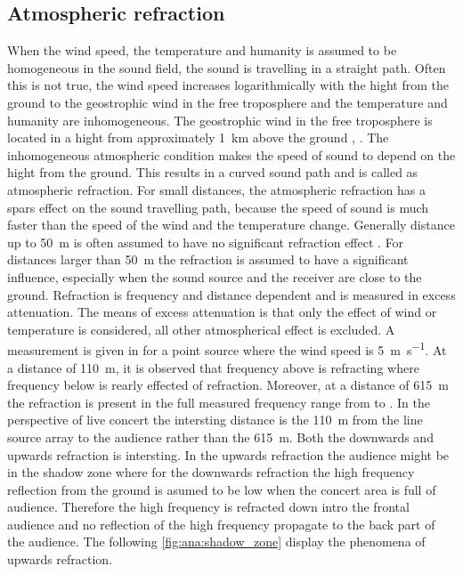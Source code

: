\subsection{Atmospheric refraction}
When the wind speed, the temperature and humanity is assumed to be homogeneous in the sound field, the sound is travelling in a straight path. Often this is not true, the wind speed increases logarithmically with the hight from the ground to the geostrophic wind \citep{asmos_acous_2016} in the free troposphere \citep{spr_hand_book} and the temperature and humanity are inhomogeneous. The geostrophic wind in the free troposphere is located in a hight from approximately \SI{1}{\kilo\meter} above the ground \citep{spr_hand_book}, \citep{geostrophic_wind}. The inhomogeneous atmospheric condition makes the speed of sound to depend on the hight from the ground. This results in a curved sound path and is called as atmospheric refraction. For small distances, the atmospheric refraction has a spars effect on the sound travelling path, because the speed of sound is much faster than the speed of the wind and the temperature change. Generally distance up to \SI{50}{\meter} is often assumed to have no significant refraction effect \citep{effect_of_wind}. For distances larger than \SI{50}{\meter} the refraction is assumed to have a significant influence, especially when the sound source and the receiver are close to the ground. Refraction is frequency and distance dependent and is measured in \db excess attenuation. The means of excess attenuation is that only the effect of wind or temperature is considered, all other atmospherical effect is excluded. A measurement is given in \citep{review_of_sound} for a point source where the wind speed is \SI{5}{\meter\per\second}. At a distance of \SI{110}{\meter}, it is observed that frequency above  is refracting where frequency below is rearly effected of refraction. Moreover, at a distance of \SI{615}{\meter} the refraction is present in the full measured frequency range from  to . In the perspective of live concert the intersting distance is the \SI{110}{\meter} from the line source array to the audience rather than the \SI{615}{\meter}. Both the downwards and upwards refraction is intersting. In the upwards refraction the audience might be in the shadow zone where for the downwards refraction the high frequency reflection from the ground is asumed to be low when the concert area is full of audience. Therefore the high frequency is refracted down intro the frontal audience and no reflection of the high frequency propagate to the back part of the audience. The following \autoref{fig:ana:shadow_zone} display the phenomena of upwards refraction.


